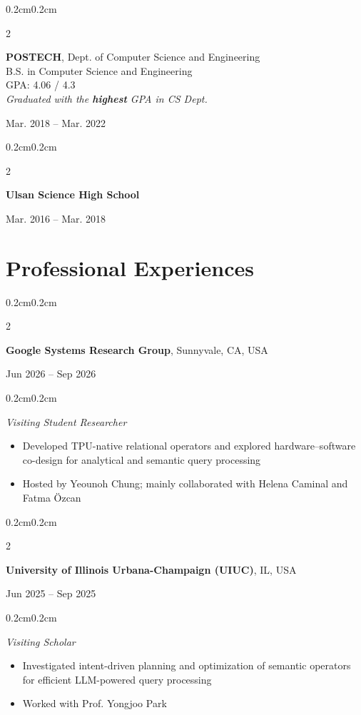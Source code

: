 \documentclass[10pt, letterpaper]{article}
\newenvironment{highlights}[1][]{
    \begin{itemize}[
        topsep=0.10cm,
        parsep=0.10cm,
        partopsep=0pt,
        itemsep=0pt,
        leftmargin=0.4cm+10pt,
        #1
    ]
}{
    \end{itemize}
}
\newenvironment{onecolentry}{
    \begin{adjustwidth}{0.2cm}{0.2cm}
}{
    \end{adjustwidth}
}
\newenvironment{twocolentry}[2][]{
    \onecolentry
    \def\secondColumn{#2}
    \setcolumnwidth{\fill, 4.5cm}
    \begin{paracol}{2}
}{
    \switchcolumn \raggedleft \secondColumn
    \end{paracol}
    \endonecolentry
}
\begin{document}
\vspace{0.2cm}
\begin{twocolentry}{Mar. 2018 -- Mar. 2022}
\textbf{POSTECH}, Dept. of Computer Science and Engineering\\
B.S. in Computer Science and Engineering\\
GPA: 4.06 / 4.3\\
\textit{Graduated with the \textbf{highest} GPA in CS Dept.}
\end{twocolentry}

\vspace{0.2cm}
\begin{twocolentry}{Mar. 2016 -- Mar. 2018}
\textbf{Ulsan Science High School}
\end{twocolentry}


\section{Professional Experiences}

\begin{twocolentry}{Jun 2026 -- Sep 2026}
\textbf{Google Systems Research Group}, Sunnyvale, CA, USA
\end{twocolentry}
\begin{onecolentry}
\textit{Visiting Student Researcher}
\begin{highlights}
    \item Developed TPU-native relational operators and explored hardware--software co-design for analytical and semantic query processing
    \item Hosted by Yeounoh Chung; mainly collaborated with Helena Caminal and Fatma \"{O}zcan
\end{highlights}
\end{onecolentry}

\vspace{2mm}

\begin{twocolentry}{Jun 2025 -- Sep 2025}
\textbf{University of Illinois Urbana-Champaign (UIUC)}, IL, USA
\end{twocolentry}
\begin{onecolentry}
\textit{Visiting Scholar}
\begin{highlights}
    \item Investigated intent-driven planning and optimization of semantic operators for efficient LLM-powered query processing
    \item Worked with Prof. Yongjoo Park
\end{highlights}
\end{onecolentry}
\end{document}
